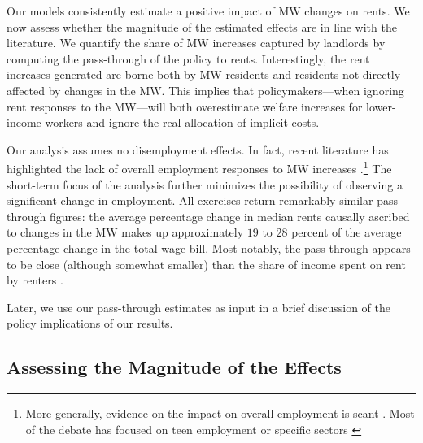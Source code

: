 
Our models consistently estimate a positive impact of MW changes on rents. We now 
assess whether the magnitude of the estimated effects are in line with the literature. 
We quantify the share of MW increases captured by landlords by computing the 
pass-through of the policy to rents. Interestingly, the rent increases generated are 
borne both by MW residents and residents not directly affected by changes in the MW.
This implies that policymakers---when ignoring rent responses to the MW---will both 
overestimate welfare increases for lower-income workers and ignore the real allocation 
of implicit costs. 

Our analysis assumes no disemployment effects. In fact, recent literature has highlighted 
the lack of overall employment responses to MW 
increases \parencite{CegnizEtAl2019}.\footnote{More generally, evidence on the impact on 
	overall employment is scant \parencite{dube2019impacts}. Most of the debate has focused 
	on teen employment \parencite{card1992using, allegretto2017credible} or specific sectors 
	\parencite{katz1992effect, card2000minimum, DubeEtAl2010}} 
The short-term focus of the analysis further minimizes the possibility of observing a 
significant change in employment. All exercises return remarkably similar pass-through 
figures: the average percentage change in median rents causally ascribed to changes in the 
MW makes up approximately $19$ to $28$ percent of the average percentage change in the total 
wage bill. Most notably, the pass-through appears to be close (although somewhat smaller) 
than the share of income spent on rent by renters \parencite{fernald2020americas}. 

Later, we use our pass-through estimates as input in a brief discussion of the policy 
implications of our results.

\subsection{Assessing the Magnitude of the Effects}\label{sec:discussion_benchmarking}

